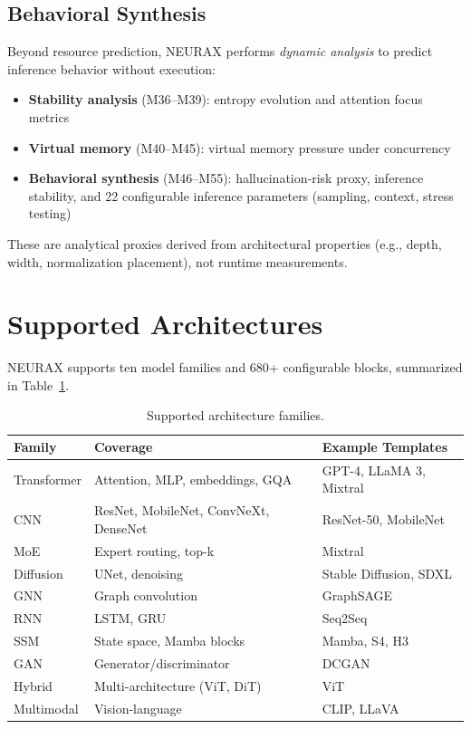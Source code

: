 \documentclass[11pt]{article}
\begin{document}
\subsection{Behavioral Synthesis}

Beyond resource prediction, NEURAX performs \emph{dynamic analysis} to predict inference behavior without execution:
\begin{itemize}
  \item \textbf{Stability analysis} (M36--M39): entropy evolution and attention focus metrics
  \item \textbf{Virtual memory} (M40--M45): virtual memory pressure under concurrency
  \item \textbf{Behavioral synthesis} (M46--M55): hallucination-risk proxy, inference stability, and 22 configurable inference parameters (sampling, context, stress testing)
\end{itemize}
These are analytical proxies derived from architectural properties (e.g., depth, width, normalization placement), not runtime measurements.

\section{Supported Architectures}

NEURAX supports ten model families and 680+ configurable blocks, summarized in Table~\ref{tab:families}.

\begin{table}[ht]
\centering
\caption{Supported architecture families.}
\begin{tabular}{@{}l l l@{}}
\toprule
\textbf{Family} & \textbf{Coverage} & \textbf{Example Templates} \\
\midrule
Transformer & Attention, MLP, embeddings, GQA & GPT-4, LLaMA 3, Mixtral \\
CNN & ResNet, MobileNet, ConvNeXt, DenseNet & ResNet-50, MobileNet \\
MoE & Expert routing, top-k & Mixtral \\
Diffusion & UNet, denoising & Stable Diffusion, SDXL \\
GNN & Graph convolution & GraphSAGE \\
RNN & LSTM, GRU & Seq2Seq \\
SSM & State space, Mamba blocks & Mamba, S4, H3 \\
GAN & Generator/discriminator & DCGAN \\
Hybrid & Multi-architecture (ViT, DiT) & ViT \\
Multimodal & Vision-language & CLIP, LLaVA \\
\bottomrule
\end{tabular}
\label{tab:families}
\end{table}
\end{document}
